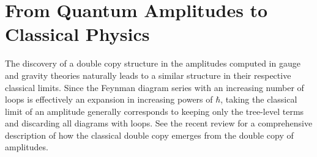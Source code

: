 \section{From Quantum Amplitudes to Classical Physics}


The discovery of a double copy structure in the amplitudes computed in gauge and gravity theories naturally leads
to a similar structure in their respective classical limits. Since the Feynman diagram series with an increasing
number of loops is effectively an expansion in increasing powers of $\hbar$, taking the classical limit of an
amplitude generally corresponds to keeping only the tree-level terms and discarding
all diagrams with loops. See the recent review \cite{Kosower:2022yvp} for a comprehensive description of how the
classical double copy emerges from the double copy of amplitudes.

